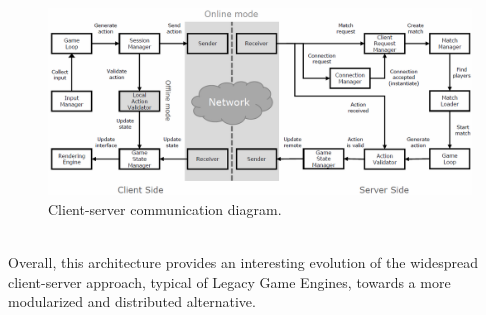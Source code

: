 \begin{figure}[h!]
	\centering
	\includegraphics[width=1\linewidth]{"immagini/State-of-the-art/distributed mobile game architecture"}
	\caption[Client-server communication diagram]{Client-server communication diagram.}
	\label{fig:distributed-mobile-game-architecture}
\end{figure}
\\ Overall, this architecture provides an interesting evolution of the widespread client-server approach, typical of Legacy Game Engines, towards a more modularized and distributed alternative.

